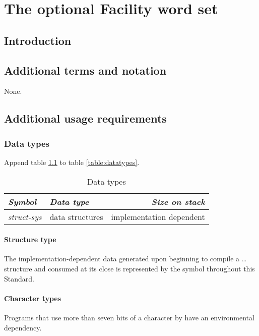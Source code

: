 \chapter{The optional Facility word set} %

\section{Introduction} %

\section{Additional terms and notation} %
None.

\section{Additional usage requirements} %

\subsection{Data types} %

Append table \ref{facility:types} to table \ref{table:datatypes}.

\begin{table}[h]
  \begin{center}
	\caption{Data types}
	\label{facility:types}
	\begin{tabular}{llr}
	\hline\hline
	\emph{Symbol} & \emph{Data type} & \emph{Size on stack} \\
	\hline
	\emph{struct-sys}
	& data structures
	& implementation dependent \\
	\hline\hline
	\end{tabular}
  \end{center}
\end{table}

\subsubsection{Structure type} %

The implementation-dependent data generated upon beginning to compile
a  {\ldots}  structure and
consumed at its close is represented by the symbol 
throughout this Standard.

\subsubsection{Character types} %
Programs that use more than seven bits of a character by
 have an environmental dependency.

